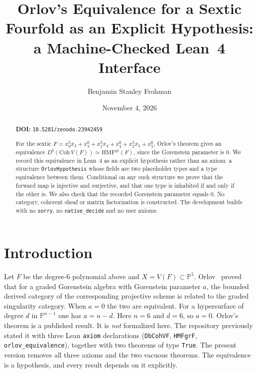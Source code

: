 \documentclass[11pt]{amsart}
\title[orlov-equivalence-VF]{Orlov's Equivalence for a Sextic Fourfold as an Explicit Hypothesis: a Machine-Checked Lean~4 Interface}
\author{Benjamin Stanley Frohman}
\date{November 4, 2026}
\theoremstyle{definition}
\theoremstyle{remark}
\begin{document}
\begin{abstract}
\noindent\textbf{DOI:} \texttt{10.5281/zenodo.23942459}\par\smallskip

For the sextic $F=x_0^5x_3+x_3^6+x_1^5x_4+x_4^6+x_2^5x_5+x_5^6$, Orlov's theorem gives an equivalence $D^b(\mathrm{Coh}\,V(F))\simeq\mathrm{HMF}^{\mathrm{gr}}(F)$, since the Gorenstein parameter is $0$. We record this equivalence in Lean~4 as an explicit hypothesis rather than an axiom: a structure \texttt{OrlovHypothesis} whose fields are two placeholder types and a type equivalence between them. Conditional on any such structure we prove that the forward map is injective and surjective, and that one type is inhabited if and only if the other is. We also check that the recorded Gorenstein parameter equals $0$. No category, coherent sheaf or matrix factorization is constructed. The development builds with no \texttt{sorry}, no \texttt{native\_decide} and no user axioms.
\end{abstract}
\maketitle
{}\par


\section{Introduction}
Let $F$ be the degree-6 polynomial above and $X=V(F)\subset\mathbb P^5$. Orlov~\cite{orlov} proved that for a graded Gorenstein algebra with Gorenstein parameter $a$, the bounded derived category of the corresponding projective scheme is related to the graded singularity category. When $a=0$ the two are equivalent. For a hypersurface of degree $d$ in $\mathbb P^{n-1}$ one has $a=n-d$. Here $n=6$ and $d=6$, so $a=0$. Orlov's theorem is a published result. It is \emph{not} formalized here. The repository previously stated it with three Lean \texttt{axiom} declarations (\texttt{DbCohVF}, \texttt{HMFgrF}, \texttt{orlov\_equivalence}), together with two theorems of type \texttt{True}. The present version removes all three axioms and the two vacuous theorems. The equivalence is a hypothesis, and every result depends on it explicitly.
\end{document}
